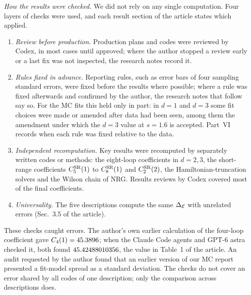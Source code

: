 \textit{How the results were checked.} We did not rely on any single computation. Four layers of checks were used, and each result section of the article states which applied.
\begin{enumerate}
\item \emph{Review before production.} Production plans and codes were reviewed by Codex, in most cases until approved; where the author stopped a review early or a last fix was not inspected, the research notes record it.
\item \emph{Rules fixed in advance.} Reporting rules, such as error bars of four sampling standard errors, were fixed before the results where possible; where a rule was fixed afterwards and confirmed by the author, the research notes that follow say so. For the MC fits this held only in part: in $d=1$ and $d=3$ some fit choices were made or amended after data had been seen, among them the amendment under which the $d=3$ value at $s=1.6$ is accepted. Part~VI records when each rule was fixed relative to the data.
\item \emph{Independent recomputation.} Key results were recomputed by separately written codes or methods: the eight-loop coefficients in $d=2,3$, the short-range coefficients $C^{\rm SR}_5(1)$ to $C^{\rm SR}_8(1)$ and $C^{\rm SR}_2(2)$, the Hamiltonian-truncation solvers and the Wilson chain of NRG. Results reviews by Codex covered most of the final coefficients.
\item \emph{Universality.} The five descriptions compute the same $\Delta_{\mathcal E}$ with unrelated errors (Sec.~3.5 of the article).
\end{enumerate}
These checks caught errors. The author's own earlier calculation of the four-loop coefficient gave $C_4(1)=45.3896$; when the Claude Code agents and GPT-6 astra checked it, both found $45.42488010356$, the value in Table~1 of the article. An audit requested by the author found that an earlier version of our MC report presented a fit-model spread as a standard deviation. The checks do not cover an error shared by all codes of one description; only the comparison across descriptions does.

